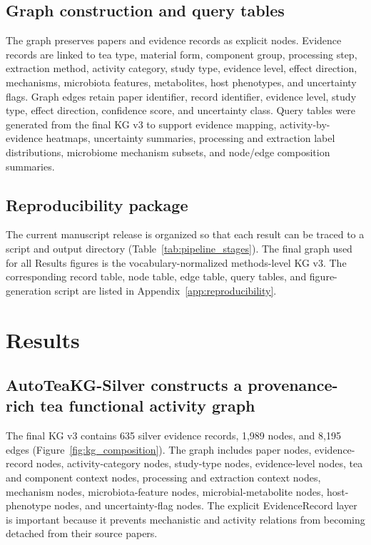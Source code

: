 \documentclass[11pt]{article}
\begin{document}
\subsection{Graph construction and query tables}

The graph preserves papers and evidence records as explicit nodes. Evidence records are linked to tea type, material form, component group, processing step, extraction method, activity category, study type, evidence level, effect direction, mechanisms, microbiota features, metabolites, host phenotypes, and uncertainty flags. Graph edges retain paper identifier, record identifier, evidence level, study type, effect direction, confidence score, and uncertainty class. Query tables were generated from the final KG v3 to support evidence mapping, activity-by-evidence heatmaps, uncertainty summaries, processing and extraction label distributions, microbiome mechanism subsets, and node/edge composition summaries.

\subsection{Reproducibility package}

The current manuscript release is organized so that each result can be traced to a script and output directory (Table~\ref{tab:pipeline_stages}). The final graph used for all Results figures is the vocabulary-normalized methods-level KG v3. The corresponding record table, node table, edge table, query tables, and figure-generation script are listed in Appendix~\ref{app:reproducibility}.

\section{Results}

\subsection{AutoTeaKG-Silver constructs a provenance-rich tea functional activity graph}

The final KG v3 contains 635 silver evidence records, 1,989 nodes, and 8,195 edges (Figure~\ref{fig:kg_composition}). The graph includes paper nodes, evidence-record nodes, activity-category nodes, study-type nodes, evidence-level nodes, tea and component context nodes, processing and extraction context nodes, mechanism nodes, microbiota-feature nodes, microbial-metabolite nodes, host-phenotype nodes, and uncertainty-flag nodes. The explicit EvidenceRecord layer is important because it prevents mechanistic and activity relations from becoming detached from their source papers.
\end{document}
